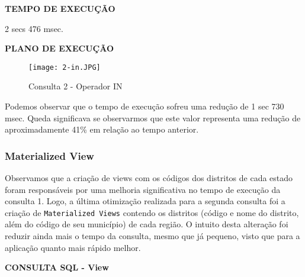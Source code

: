 \documentclass[12pt,a4paper]{article}
\begin{document}
\begin{flushleft}
\textbf{TEMPO DE EXECUÇÃO}\\
\end{flushleft}
2 secs 476 msec.\\

\begin{flushleft}
\textbf{PLANO DE EXECUÇÃO}\\
\end{flushleft}

\begin{figure}[H]
    \centering
    \texttt{[image: 2-in.JPG]}
    \caption{Consulta 2 - Operador IN}
    \label{fig:diagrama}
\end{figure}

Podemos observar que o tempo de execução sofreu uma redução de 1 sec 730 msec. Queda significava se observarmos que este valor representa uma redução de aproximadamente 41\% em relação ao tempo anterior.


\subsubsection{Materialized View}

Observamos que a criação de views com os códigos dos distritos de cada estado foram responsáveis por uma melhoria significativa no tempo de execução da consulta 1. Logo, a última otimização realizada para a segunda consulta foi a criação de \texttt{Materialized Views} contendo os distritos (código e nome do distrito, além do código de seu município) de cada região. O intuito desta alteração foi reduzir ainda mais o tempo da consulta, mesmo que já pequeno, visto que para a aplicação quanto mais rápido melhor.

\vspace{0.5cm}

\begin{flushleft}
\textbf{CONSULTA SQL - View}\\
\end{flushleft}
\end{document}
